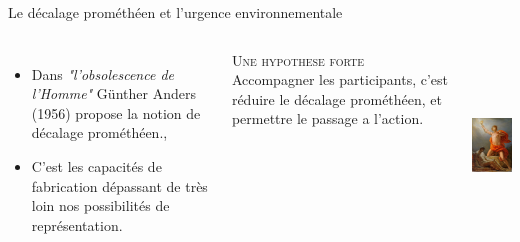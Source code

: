 \documentclass[newPxFont]{beamer}
\begin{document}
  \begin{frame}[c]{Le décalage prométhéen et l'urgence environnementale}
    \vspace{-1cm}
    \begin{columns}[onlytextwidth,T]
      \column{\dimexpr\linewidth-30mm-5mm}
      \begin{itemize}
        \item Dans \textit{"l'obsolescence de l'Homme"} Günther Anders (1956) propose la notion de décalage prométhéen., 
        \item C'est les capacités de fabrication dépassant de très loin nos possibilités de représentation.
      \end{itemize}
      
      \small{
        \begin{alertblock}{\textsc{Une hypothese forte}}
          Accompagner les participants, c'est réduire le décalage prométhéen, et permettre le passage a l'action.
        \end{alertblock}
      }
      \column{30mm}
      \includegraphics[height=5cm]{img/promethee.jpg}
    \end{columns}
  \end{frame}
\end{document}
